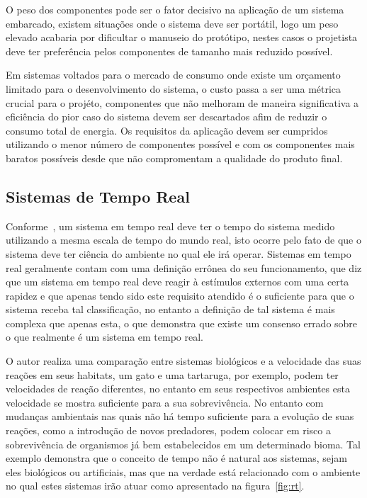 O peso dos componentes pode ser o fator decisivo na aplicação de um sistema embarcado, existem situações onde o sistema deve ser portátil, logo um peso elevado acabaria por dificultar o manuseio do protótipo, nestes casos o projetista deve ter preferência pelos componentes de tamanho mais reduzido possível.

Em sistemas voltados para o mercado de consumo onde existe um orçamento limitado para o desenvolvimento do sistema, o custo passa a ser uma métrica crucial para o projéto, componentes que não melhoram de maneira significativa a eficiência do pior caso do sistema devem ser descartados afim de reduzir o consumo total de energia. Os requisitos da aplicação devem ser cumpridos utilizando o menor número de componentes possível e com os componentes mais baratos possíveis desde que não compromentam a qualidade do produto final.

\subsection{Sistemas de Tempo Real} %

Conforme~\cite{BUTTAZZO:2011}, um sistema em tempo real deve ter o tempo do sistema medido utilizando a mesma escala de tempo do mundo real, isto ocorre pelo fato de que o sistema deve ter ciência do ambiente no qual ele irá operar. Sistemas em tempo real geralmente contam com uma definição errônea do seu funcionamento, que diz que um sistema em tempo real deve reagir à estímulos externos com uma certa rapidez e que apenas tendo sido este requisito atendido é o suficiente para que o sistema receba tal classificação, no entanto a definição de tal sistema é mais complexa que apenas esta, o que demonstra que existe um consenso errado sobre o que realmente é um sistema em tempo real.

O autor realiza uma comparação entre sistemas biológicos e a velocidade das suas reações em seus habitats, um gato e uma tartaruga, por exemplo, podem ter velocidades de reação diferentes, no entanto em seus respectivos ambientes esta velocidade se mostra suficiente para a sua sobrevivência. No entanto com mudanças ambientais nas quais não há tempo suficiente para a evolução de suas reações, como a introdução de novos predadores, podem colocar em risco a sobrevivência de organismos já bem estabelecidos em um determinado bioma. Tal exemplo demonstra que o conceito de tempo não é natural aos sistemas, sejam eles biológicos ou artificiais, mas que na verdade está relacionado com o ambiente no qual estes sistemas irão atuar como apresentado na figura~\ref{fig:rt}.

